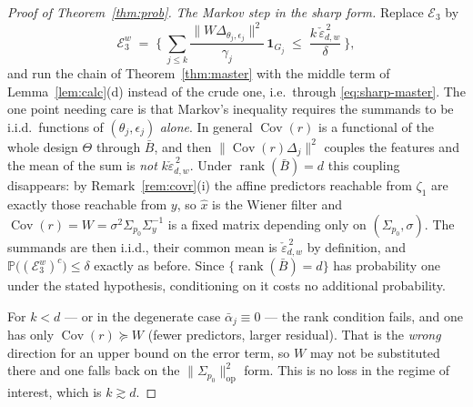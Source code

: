 \documentclass[11pt]{article}
\theoremstyle{remark}
\newcommand{\Cov}{\operatorname{Cov}}
\newcommand{\Sig}{\Sigma_{p_0}}
\newcommand{\Sy}{\Sigma_y}
\newcommand{\op}[1]{\lVert #1 \rVert_{\mathrm{op}}}
\begin{document}
\begin{proof}[Proof of Theorem~\ref{thm:prob}]
\emph{The Markov step in the sharp form.} Replace $\mathcal E_3$ by
\[
\mathcal E_3^{w} \;=\; \Big\{\ \sum_{j\le k}\frac{\lVert W\Delta_{\theta_j,\epsilon_j}\rVert^2}{\gamma_j}\,\mathbf 1_{G_j} \;\le\; \frac{k\,\check\varepsilon_{d,w}^{\,2}}{\delta}\ \Big\},
\]
and run the chain of Theorem~\ref{thm:master} with the middle term of Lemma~\ref{lem:calc}(d) instead of the crude one, i.e.\ through \eqref{eq:sharp-master}. The one point needing care is that Markov's inequality requires the summands to be i.i.d.\ functions of $(\theta_j,\epsilon_j)$ \emph{alone}. In general $\Cov(r)$ is a functional of the whole design $\Theta$ through $\bar B$, and then $\lVert\Cov(r)\Delta_j\rVert^2$ couples the features and the mean of the sum is \emph{not} $k\check\varepsilon_{d,w}^{\,2}$. Under $\operatorname{rank}(\bar B)=d$ this coupling disappears: by Remark~\ref{rem:covr}(i) the affine predictors reachable from $\zeta_1$ are exactly those reachable from $y$, so $\hat x$ is the Wiener filter and $\Cov(r) = W = \sigma^2\Sig\Sy^{-1}$ is a fixed matrix depending only on $(\Sig,\sigma)$. The summands are then i.i.d., their common mean is $\check\varepsilon_{d,w}^{\,2}$ by definition, and $\mathbb P\big((\mathcal E_3^{w})^c\big) \le \delta$ exactly as before. Since $\{\operatorname{rank}(\bar B)=d\}$ has probability one under the stated hypothesis, conditioning on it costs no additional probability.

For $k < d$ --- or in the degenerate case $\bar\alpha_j \equiv 0$ --- the rank condition fails, and one has only $\Cov(r) \succeq W$ (fewer predictors, larger residual). That is the \emph{wrong} direction for an upper bound on the error term, so $W$ may not be substituted there and one falls back on the $\op{\Sig}^2$ form. This is no loss in the regime of interest, which is $k \gtrsim d$.

\end{proof}
\end{document}
